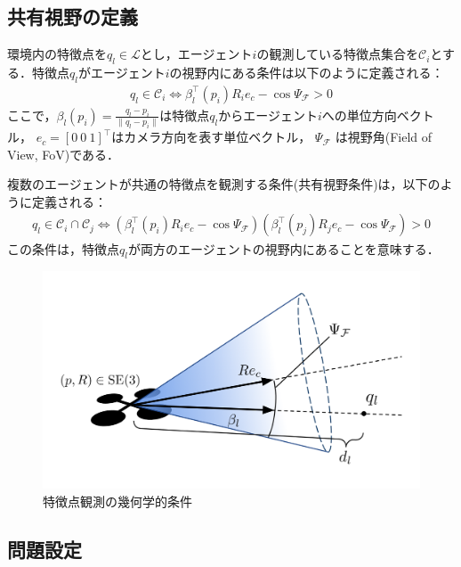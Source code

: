 \subsection{共有視野の定義}

環境内の特徴点を$q_l \in \mathcal{L}$とし，エージェント$i$の観測している特徴点集合を$\mathcal{C}_i$とする．特徴点$q_l$がエージェント$i$の視野内にある条件は以下のように定義される：
\begin{equation}
\begin{aligned}
q_l \in \mathcal{C}_i \iff \beta_l^{\top}(p_i)R_ie_c - \cos\Psi_{\mathcal{F}} > 0
\label{eq:fov_condition}
\end{aligned}
\end{equation}
ここで，$\beta_l(p_i) = \frac{q_l-p_i}{\|q_l-p_i\|}$は特徴点$q_l$からエージェント$i$への単位方向ベクトル，
$e_c = [0\:0\:1]^\top$はカメラ方向を表す単位ベクトル，
$\Psi_{\mathcal{F}}$
は視野角(Field of View, FoV)である．

複数のエージェントが共通の特徴点を観測する条件(共有視野条件)は，以下のように定義される：
\begin{equation}
\begin{aligned}
q_l \in {\mathcal{C}}_i \cap {\mathcal{C}}_j \iff (\beta_l^{\top}(p_i)R_ie_c - \cos\Psi_{\mathcal{F}})(\beta_l^{\top}(p_j)R_je_c - \cos\Psi_{\mathcal{F}}) > 0
\label{eq:shared_fov_condition}
\end{aligned}
\end{equation}
この条件は，特徴点$q_l$が両方のエージェントの視野内にあることを意味する．

\begin{figure}[htbp]
\centering
\includegraphics[width=0.8\linewidth]{fig/geometry.png}
\caption{特徴点観測の幾何学的条件}
\label{fig:geometry}
\end{figure}

\subsection{問題設定}

